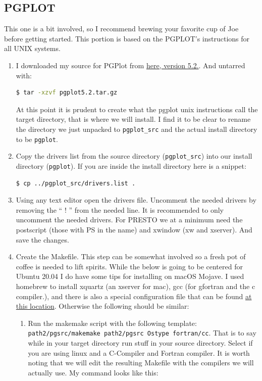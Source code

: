 \documentclass{article}
\begin{document}
    	\subsection{PGPLOT}
    	This one is a bit involved, so I recommend brewing your favorite cup of Joe before getting started. This
    	portion is based on the PGPLOT’s instructions for all UNIX systems. 
    	\begin{enumerate}
    	\item \noindent I downloaded my source for PGPlot from \href{ftp://ftp.astro.caltech.edu/pub/pgplot/pgplot5.2.tar.gz}{here, version 5.2.}. And untarred with: 
    	\begin{lstlisting}[language=bash]
    	$ tar -xzvf pgplot5.2.tar.gz
    	\end{lstlisting}
    	 At this point it is prudent to create what the pgplot unix instructions call the target directory, that is where we will install. I find it to be clear to rename the directory we just unpacked to \texttt{pgplot\_src} and the actual install directory to be \texttt{pgplot}. 
    	\item Copy the drivers list from the source directory (\texttt{pgplot\_src}) into our install directory (\texttt{pgplot}). If you are inside the install directory here is a snippet: \noindent
    	\begin{lstlisting}[language=bash]
    	$ cp ../pgplot_src/drivers.list .
    	\end{lstlisting} 
    	\item Using any text editor open the drivers file. Uncomment the needed drivers by removing the `` ! '' from the needed line. It is recommended to only uncomment the needed drivers. For PRESTO we at a minimum need the postscript (those with PS in the name) and xwindow (xw and xserver). And save the changes. 
    	\item Create the Makefile. This step can be somewhat involved so a fresh pot of coffee is needed to lift spirits. While the below is going to be centered for Ubuntu 20.04 I do have some tips for installing on macOS Mojave. I used homebrew to install xquartz (an xserver for mac), gcc (for gfortran and the c compiler.), and there is also a special configuration file that can be found \href{http://mingus.as.arizona.edu/~bjw/software/pgplot_macosx_conf.tar}{at this location}. Otherwise the following should be similar:
    		\begin{enumerate}
    			\item Run the makemake script with the following template: \texttt{path2/pgsrc/makemake path2/pgsrc Ostype fortran/cc}. That is to say while in your target directory run stuff in your source directory. Select if you are using linux and a C-Compiler and Fortran compiler. It is worth noting that we will edit the resulting Makefile with the compilers we will actually use. My command looks like this: \begin{lstlisting}[language=bash]


\end{lstlisting}
\end{enumerate}
\end{enumerate}
\end{document}
